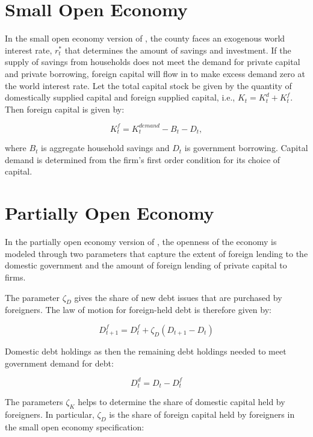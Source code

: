 
\section{Small Open Economy}
In the small open economy version of \ogindia, the county faces an exogenous world interest rate, $r^{*}_{t}$ that determines the amount of savings and investment.  If the supply of savings from households does not meet the demand for private capital and private borrowing, foreign capital will flow in to make excess demand zero at the world interest rate.  Let the total capital stock be given by the quantity of domestically supplied capital and foreign supplied capital, i.e., $K_{t}= K^{d}_{t}+K^{f}_{t}$.  Then foreign capital is given by:

\begin{equation}
  K^{f}_{t} = K^{demand}_{t} - B_{t} - D_{t},
\end{equation}

where $B_{t}$ is aggregate household savings and $D_{t}$ is government borrowing.  Capital demand is determined from the firm's first order condition for its choice of capital.

\section{Partially Open Economy}

In the partially open economy version of \ogindia, the openness of the economy is modeled through two parameters that capture the extent of foreign lending to the domestic government and the amount of foreign lending of private capital to firms.


The parameter $\zeta_{D}$ gives the share of new debt issues that are purchased by foreigners.  The law of motion for foreign-held debt is therefore given by:

\begin{equation}
  D^{f}_{t+1} = D^{f}_{t} + \zeta_{D}(D_{t+1} - D_{t})
\end{equation}

Domestic debt holdings as then the remaining debt holdings needed to meet government demand for debt:

\begin{equation}
  D^{d}_{t} = D_{t} - D^{f}_{t}
\end{equation}


The parameters $\zeta_{K}$ helps to determine the share of domestic capital held by foreigners.  In particular, $\zeta_{D}$ is the share of foreign capital held by foreigners in the small open economy specification:

